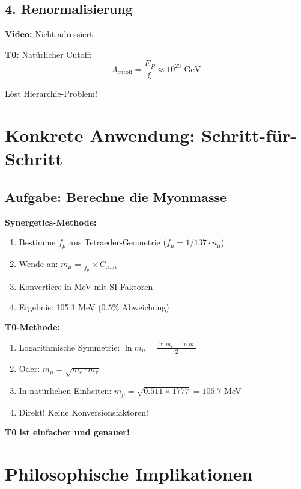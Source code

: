 \documentclass[12pt,a4paper]{article}
\newcommand{\xipar}{\xi}
\begin{document}
	\subsection{4. Renormalisierung}
	
	\textbf{Video:} Nicht adressiert
	
	\textbf{T0:} Natürlicher Cutoff:
	\begin{equation}
		\Lambda_{\text{cutoff}} = \frac{E_P}{\xipar} \approx 10^{23} \text{ GeV}
	\end{equation}
	
	Löst Hierarchie-Problem!
	
	\section{Konkrete Anwendung: Schritt-für-Schritt}
	
	\subsection{Aufgabe: Berechne die Myonmasse}
	
	\textbf{Synergetics-Methode:}
	\begin{enumerate}
		\item Bestimme $f_\mu$ aus Tetraeder-Geometrie ($f_\mu = 1/137 \cdot n_\mu$)
		\item Wende an: $m_\mu = \frac{1}{f_\mu} \times C_{\text{conv}}$
		\item Konvertiere in MeV mit SI-Faktoren
		\item Ergebnis: 105.1 MeV (0.5\% Abweichung)
	\end{enumerate}
	
	\textbf{T0-Methode:}
	\begin{enumerate}
		\item Logarithmische Symmetrie: $\ln m_\mu = \frac{\ln m_e + \ln m_\tau}{2}$
		\item Oder: $m_\mu = \sqrt{m_e \cdot m_\tau}$
		\item In natürlichen Einheiten: $m_\mu = \sqrt{0.511 \times 1777} = 105.7$ MeV
		\item Direkt! Keine Konversionsfaktoren!
	\end{enumerate}
	
	\textbf{T0 ist einfacher und genauer!}
	
	\section{Philosophische Implikationen}
	
\end{document}
